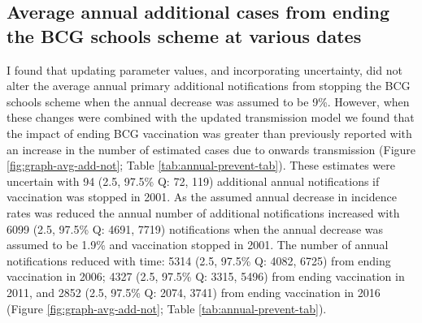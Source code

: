 \documentclass[11pt,twoside]{bristolthesis}
\begin{document}
  \hypertarget{average-annual-additional-cases-from-ending-the-bcg-schools-scheme-at-various-dates}{%
  \subsection{Average annual additional cases from ending the BCG schools scheme at various dates}\label{average-annual-additional-cases-from-ending-the-bcg-schools-scheme-at-various-dates}}
  
  I found that updating parameter values, and incorporating uncertainty, did not alter the average annual primary additional notifications from stopping the BCG schools scheme when the annual decrease was assumed to be 9\%. However, when these changes were combined with the updated transmission model we found that the impact of ending BCG vaccination was greater than previously reported with an increase in the number of estimated cases due to onwards transmission (Figure \ref{fig:graph-avg-add-not}; Table \ref{tab:annual-prevent-tab}). These estimates were uncertain with 94 (2.5, 97.5\% Q: 72, 119) additional annual notifications if vaccination was stopped in 2001. As the assumed annual decrease in incidence rates was reduced the annual number of additional notifications increased with 6099 (2.5, 97.5\% Q: 4691, 7719) notifications when the annual decrease was assumed to be 1.9\% and vaccination stopped in 2001. The number of annual notifications reduced with time: 5314 (2.5, 97.5\% Q: 4082, 6725) from ending vaccination in 2006; 4327 (2.5, 97.5\% Q: 3315, 5496) from ending vaccination in 2011, and 2852 (2.5, 97.5\% Q: 2074, 3741) from ending vaccination in 2016 (Figure \ref{fig:graph-avg-add-not}; Table \ref{tab:annual-prevent-tab}).
  
\end{document}

